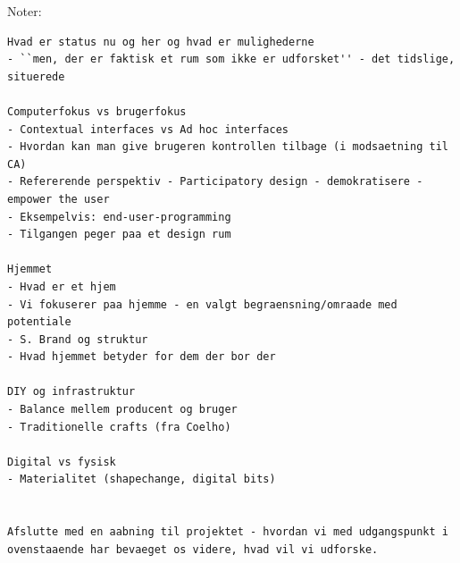 Noter:
\begin{verbatim}
Hvad er status nu og her og hvad er mulighederne
- ``men, der er faktisk et rum som ikke er udforsket'' - det tidslige, situerede

Computerfokus vs brugerfokus
- Contextual interfaces vs Ad hoc interfaces
- Hvordan kan man give brugeren kontrollen tilbage (i modsaetning til CA)
- Refererende perspektiv - Participatory design - demokratisere - empower the user
- Eksempelvis: end-user-programming
- Tilgangen peger paa et design rum

Hjemmet
- Hvad er et hjem
- Vi fokuserer paa hjemme - en valgt begraensning/omraade med potentiale
- S. Brand og struktur
- Hvad hjemmet betyder for dem der bor der

DIY og infrastruktur
- Balance mellem producent og bruger
- Traditionelle crafts (fra Coelho)

Digital vs fysisk
- Materialitet (shapechange, digital bits)


Afslutte med en aabning til projektet - hvordan vi med udgangspunkt i ovenstaaende har bevaeget os videre, hvad vil vi udforske.
\end{verbatim}